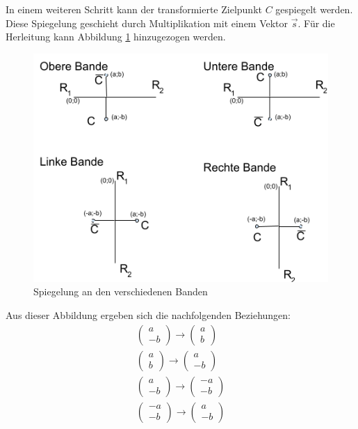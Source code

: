 In einem weiteren Schritt kann der transformierte Zielpunkt $C$ gespiegelt werden. Diese Spiegelung geschieht durch
Multiplikation mit einem Vektor $\vec{s}$. Für die Herleitung kann Abbildung \ref{fig:bandenspiegelung} hinzugezogen werden.

\begin{figure}[h!]
    \begin{center}
        \includegraphics[width=0.8\linewidth]{../common/07_appendix/resources/02_bandenspiegelung.png}
    \end{center}
    \caption{Spiegelung an den verschiedenen Banden}
    \label{fig:bandenspiegelung}
\end{figure}

Aus dieser Abbildung ergeben sich die nachfolgenden Beziehungen:
\begin{align}
    \begin{pmatrix}a \\ -b\end{pmatrix} \rightarrow \begin{pmatrix}a \\ b\end{pmatrix}\\
    \begin{pmatrix}a \\ b\end{pmatrix} \rightarrow \begin{pmatrix}a \\ -b\end{pmatrix}\\
    \begin{pmatrix}a \\ -b\end{pmatrix} \rightarrow \begin{pmatrix}-a \\ -b\end{pmatrix}\\
    \begin{pmatrix}-a \\ -b\end{pmatrix} \rightarrow \begin{pmatrix}a \\ -b\end{pmatrix}\\
\end{align}

